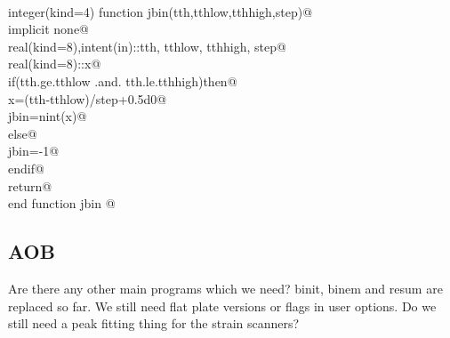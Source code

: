 \documentclass[10pt,a4paper,notitlepage]{article}
\begin{document}
\begin{flushleft}
\begin{list}{}{}
\mbox{}\verb@@\\
\mbox{}\verb@      integer(kind=4) function jbin(tth,tthlow,tthhigh,step)@\\
\mbox{}\verb@      implicit none@\\
\mbox{}\verb@      real(kind=8),intent(in)::tth, tthlow, tthhigh, step@\\
\mbox{}\verb@      real(kind=8)::x@\\
\mbox{}\verb@      if(tth.ge.tthlow .and. tth.le.tthhigh)then@\\
\mbox{}\verb@       x=(tth-tthlow)/step+0.5d0@\\
\mbox{}\verb@       jbin=nint(x)@\\
\mbox{}\verb@      else@\\
\mbox{}\verb@       jbin=-1@\\
\mbox{}\verb@      endif@\\
\mbox{}\verb@      return@\\
\mbox{}\verb@      end function jbin                                                     @{\NWsep}
\end{list}
\vspace{-1.5ex}
\footnotesize
\begin{list}{}{\setlength{\itemsep}{-\parsep}\setlength{\itemindent}{-\leftmargin}}

\item{}
\end{list}
\vspace{4ex}
\end{flushleft}
\subsection{AOB}
Are there any other main programs which we need? 
binit, binem and resum are replaced so far.
We still need flat plate versions or flags in user options.
Do we still need a peak fitting thing for the strain scanners?
\end{document}

